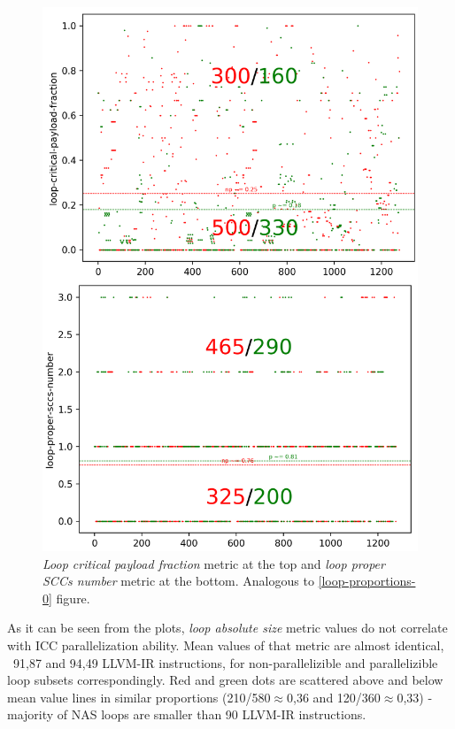 \begin{figure}[H]
\centering
\includegraphics[width=\linewidth]{figs/loop-proportions-1.png}
\caption{\textit{Loop critical payload fraction} metric at the top and \textit{loop proper SCCs number} metric at the bottom. Analogous to \ref{loop-proportions-0} figure.}
\label{loop-proportions-1}
\end{figure} 
\quad As it can be seen from the plots, \textit{loop absolute size} metric values do not correlate with ICC parallelization ability. Mean values of that metric are almost identical, ~91,87 and 94,49 LLVM-IR instructions, for non-parallelizible and parallelizible loop subsets correspondingly. Red and green dots are scattered above and below mean value lines in similar proportions (210/580$\approx$0,36 and 120/360$\approx$0,33) - majority of NAS loops are smaller than 90 LLVM-IR instructions.\newline

